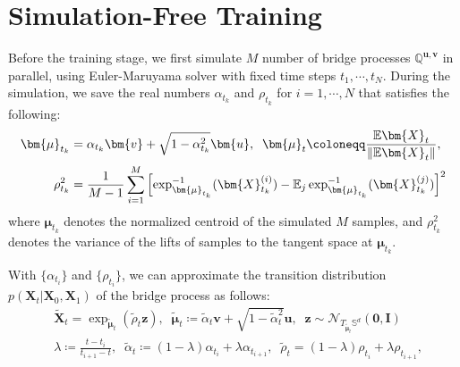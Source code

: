 \section{Simulation-Free Training}
Before the training stage, we first simulate $M$ number of bridge processes $\mathbb{Q}^{\bm{u},\bm{v}}$ in parallel, using Euler-Maruyama solver with fixed time steps $t_1,\cdots,t_N$. During the simulation, we save the real numbers $\alpha_{t_k}$ and $\rho_{t_k}$ for $i=1,\cdots,N$ that satisfies the following:
\begin{align}
    \bm{\mu}_{t_k} &= \alpha_{t_k}\bm{v} + \sqrt{1 - \alpha_{t_k}^2}\bm{u}, \;\; \bm{\mu}_t \coloneqq \frac{\mathbb{E}\bm{X}_{t}}{\|\mathbb{E}\bm{X}_{t}\|}, \\
    \rho_{t_k}^2 &= \frac{1}{M-1} \sum^{M}_{i=1} \left[ \exp^{-1}_{\bm{\mu}_{t_k}}(\bm{X}^{(i)}_{t_k}) -  \mathbb{E}_j \exp^{-1}_{\bm{\mu}_{t_k}}(\bm{X}^{(j)}_{t_k})\right]^2 \notag
\end{align}
where $\bm{\mu}_{t_k}$ denotes the normalized centroid of the simulated $M$ samples, and $\rho_{t_k}^2$ denotes the variance of the lifts of samples to the tangent space at $\bm{\mu}_{t_k}$.

With $\{\alpha_{t_i}\}$ and $\{\rho_{t_i}\}$, we can approximate the transition distribution $p(\bm{X}_t|\bm{X}_0,\bm{X}_1)$ of the bridge process as follows:
\begin{align}
    &\tilde{\bm{X}}_t = \exp_{\tilde{\bm{\mu}}_t}(\tilde{\rho}_t \bm{z}), \;\;
    \tilde{\bm{\mu}}_t \coloneqq \tilde{\alpha}_t \bm{v} + \sqrt{1 - \tilde{\alpha}_t^2} \bm{u}, \;\;
    \bm{z}\sim \mathcal{N}_{T_{\tilde{\bm{\mu}}_t}\mathbb{S}^d}(\mathbf{0}, \mathbf{I}) \\ 
    &\lambda \coloneqq \frac{t - t_i}{t_{i+1} - t}, \;\;
    \tilde{\alpha}_t \coloneqq (1-\lambda) \alpha_{t_i} + \lambda \alpha_{t_{i+1}}, \;\;
    \tilde{\rho}_t = (1-\lambda) \rho_{t_i} + \lambda \rho_{t_{i+1}},
\end{align}